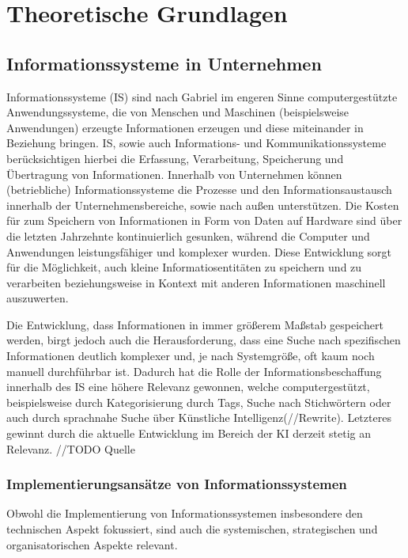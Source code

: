 \section{Theoretische Grundlagen}

\subsection{Informationssysteme in Unternehmen}
Informationssysteme (IS) sind nach Gabriel im engeren Sinne computergestützte Anwendungssysteme, die von Menschen und Maschinen (beispielsweise Anwendungen) erzeugte Informationen erzeugen und diese miteinander in Beziehung bringen. IS, sowie auch Informations- und Kommunikationssysteme berücksichtigen hierbei die Erfassung, Verarbeitung, Speicherung und Übertragung von Informationen.\autocite[Vgl.][]{InformationssystemEnzyklopaedieWirtschaftsinformatik2019}
Innerhalb von Unternehmen können (betriebliche) Informationssysteme die Prozesse und den Informationsaustausch innerhalb der Unternehmensbereiche, sowie nach außen unterstützen. Die Kosten für zum Speichern von Informationen in Form von Daten auf Hardware sind über die letzten Jahrzehnte kontinuierlich gesunken, während die Computer und Anwendungen leistungsfähiger und komplexer wurden. Diese Entwicklung sorgt für die Möglichkeit, auch kleine Informatiosentitäten zu speichern und zu verarbeiten beziehungsweise in Kontext mit anderen Informationen maschinell auszuwerten.\autocite[Vgl.][Kap. 1.1]{WirtschaftsinformatikEBSCO}

Die Entwicklung, dass Informationen in immer größerem Maßstab gespeichert werden, birgt jedoch auch die Herausforderung, dass eine Suche nach spezifischen Informationen deutlich komplexer und, je nach Systemgröße, oft kaum noch manuell durchführbar ist. Dadurch hat die Rolle der Informationsbeschaffung innerhalb des IS eine höhere Relevanz gewonnen, welche computergestützt, beispielsweise durch Kategorisierung durch Tags, Suche nach Stichwörtern oder auch durch sprachnahe Suche über Künstliche Intelligenz(//Rewrite). Letzteres gewinnt durch die aktuelle Entwicklung im Bereich der KI derzeit stetig an Relevanz. //TODO Quelle

\subsubsection{Implementierungsansätze von Informationssystemen}
Obwohl die Implementierung von Informationssystemen insbesondere den technischen Aspekt fokussiert, sind auch die systemischen, strategischen und organisatorischen Aspekte relevant.\autocite[Vgl.][]{wainwrightThreeDomainsImplementing2004}

